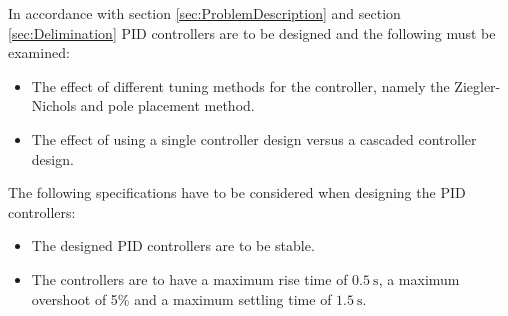 \documentclass[../../main.tex]{subfiles}
\begin{document}
In accordance with section \ref{sec:ProblemDescription} and section \ref{sec:Delimination} PID controllers are to be designed and the following must be examined:
\begin{itemize}
    \item The effect of different tuning methods for the controller, namely the Ziegler-Nichols and pole placement method.
    \item The effect of using a single controller design versus a cascaded controller design.
\end{itemize}

The following specifications have to be considered when designing the PID controllers:
\begin{itemize}
    \item The designed PID controllers are to be stable.
    \item The controllers are to have a maximum rise time of $\SI{0.5}{\second}$, a maximum overshoot of 5\% and a maximum settling time of $\SI{1.5}{\second}$.
\end{itemize}
\end{document}
